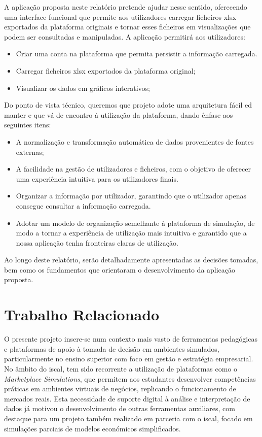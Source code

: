 A aplicação proposta neste relatório pretende ajudar nesse sentido, oferecendo uma interface  funcional que permite aos utilizadores carregar ficheiros \gls{xlsx} exportados da plataforma originais e tornar esses ficheiros em visualizações que podem ser consultadas e manipuladas. A aplicação permitirá aos utilizadores:
\begin{itemize}
    \item Criar uma conta na plataforma que permita persistir a informação carregada.
    \item Carregar ficheiros \gls{xlsx} exportados da plataforma original;
    \item Visualizar os dados em gráficos interativos;
\end{itemize}

Do ponto de vista técnico, queremos que  projeto adote uma arquitetura fácil ed manter e que vá de encontro à utilização da plataforma, dando ênfase aos seguintes itens:
\begin{itemize}
    \item A normalização e transformação automática de dados provenientes de fontes externas;
    \item A facilidade na gestão de utilizadores e ficheiros, com o objetivo de oferecer uma experiência intuitiva para os utilizadores finais.
    \item Organizar a informação por utilizador, garantindo que o utilizador apenas consegue consultar a informação carregada.
    \item Adotar um modelo de organização semelhante à plataforma de simulação, de modo a tornar a experiência de utilização mais intuitiva e garantido que a nossa aplicação tenha fronteiras claras de utilização.
\end{itemize}

Ao longo deste relatório, serão detalhadamente apresentadas as decisões tomadas, bem como os fundamentos que orientaram o desenvolvimento da aplicação proposta.

\chapter{Trabalho Relacionado}
\label{ch:trabalhoRelacionado}

O presente projeto insere-se num contexto mais vasto de ferramentas pedagógicas e plataformas de apoio à tomada de decisão em ambientes simulados, particularmente no ensino superior com foco em gestão e estratégia empresarial. No âmbito do \gls{iscal}, tem sido recorrente a utilização de plataformas como o \textit{Marketplace Simulations}, que permitem aos estudantes desenvolver competências práticas em ambientes virtuais de negócios, replicando o funcionamento de mercados reais. Esta necessidade de suporte digital à análise e interpretação de dados já motivou o desenvolvimento de outras ferramentas auxiliares, com destaque para um projeto também realizado em parceria com o \gls{iscal}, focado em simulações parciais de modelos económicos simplificados.


